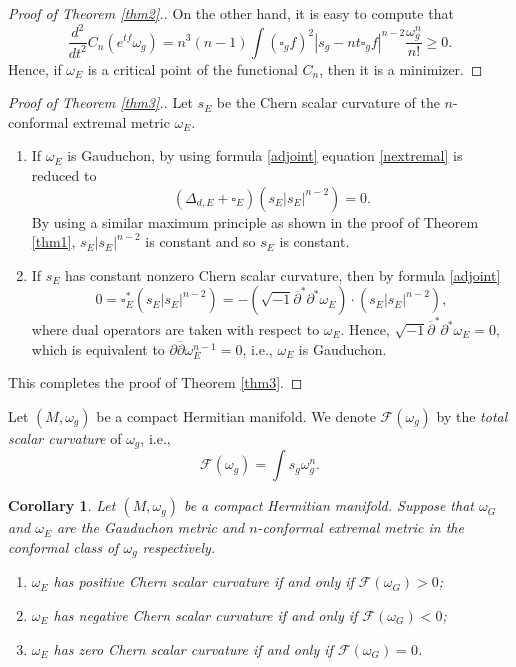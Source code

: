 \documentclass[12pt]{amsart}
\newcommand\bp{{\bar\partial}}
\theoremstyle{plain}
\newtheorem{cor}[thm]{Corollary}
\theoremstyle{definition}
\newcommand{\bcorollary}{\begin{cor}}
\newcommand{\ecorollary}{\end{cor}}
\newcommand{\sq}{\sqrt{-1}}
\newcommand{\p}{\partial}
\renewcommand{\bar}{\overline}
\newcommand{\beq}{\begin{equation}}
\newcommand{\eeq}{\end{equation}}
\newcommand{\bd}{\begin{enumerate}}
\newcommand{\ed}{\end{enumerate}}
\renewcommand{\bp}{\bar{\partial}}
\renewcommand{\>}{\rightarrow}
\renewcommand{\#}{\sharp}
\numberwithin{equation}{section} %
\begin{document}
\begin{proof}[Proof of Theorem \ref{thm2}.]
         On the other hand, it is easy to compute that
        \beq
            \frac{d^2}{dt^2}C_n(e^{tf}\omega_g)=n^3(n-1)\int \left(\square_g f\right)^2\left|s_g-nt\square_g f\right|^{n-2}\frac{\omega_g^n}{n!}\geq 0.
        \eeq
        Hence, if $\omega_E$ is a critical point of the functional
        $C_n$, then it is a minimizer.
    \end{proof}

\baselineskip


    \begin{proof}[Proof of Theorem \ref{thm3}.]   Let $s_E$ be the Chern scalar curvature of  the $n$-conformal extremal metric $\omega_E$.
        \bd \item  If $\omega_E$ is Gauduchon, by using formula \eqref{adjoint} equation \eqref{nextremal} is reduced to
        \beq \left(\Delta_{d,E}+\square_E\right)\left(s_E|s_E|^{n-2}\right)=0.\eeq
    By using a similar maximum principle as shown in the proof of Theorem \ref{thm1},   $s_E|s_E|^{n-2}$ is constant and so $s_E$ is constant.

    \item If $s_E$ has constant nonzero Chern scalar curvature, then by formula \eqref{adjoint} $$0=\square_E^*\left(s_E|s_E|^{n-2}\right)=-\left(\sq\bp^*\p^*\omega_E\right)\cdot \left(s_E|s_E|^{n-2}\right),$$
    where  dual operators are taken with respect to $\omega_E$.
     Hence, $\sq\bp^*\p^*\omega_E=0$, which is equivalent to  $\p\bp\omega^{n-1}_E=0$, i.e.,  $\omega_E$ is Gauduchon. \ed
     This completes the proof of Theorem \ref{thm3}.
    \end{proof}






Let $(M,\omega_g)$ be a compact Hermitian manifold. We denote $\mathscr F(\omega_g)$ by the \textit{total scalar curvature} of $\omega_g$, i.e.,
\beq
\mathscr F(\omega_g)=\int s_g\omega_g^n.
\eeq




\bcorollary Let $(M,\omega_g)$ be a compact Hermitian manifold. Suppose that $\omega_G$ and $\omega_E$ are the Gauduchon metric and  $n$-conformal extremal metric  in the conformal class of $\omega_g$ respectively.
\bd \item $\omega_E$ has positive Chern scalar curvature if and only if  $\mathscr F(\omega_G)>0$;
\item $\omega_E$ has negative Chern scalar curvature if and only if  $\mathscr F(\omega_G)<0$;
\item $\omega_E$ has  zero Chern scalar curvature if and only if $\mathscr F(\omega_G)=0$.
\ed
\ecorollary
\end{document}
